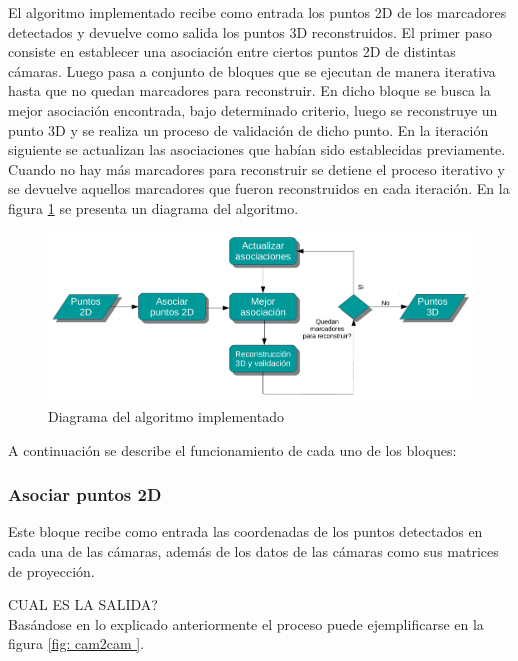 El algoritmo implementado recibe como entrada los puntos 2D de los marcadores detectados y devuelve como salida los puntos 3D reconstruidos. El primer paso consiste en establecer una asociación entre ciertos puntos 2D de distintas cámaras. Luego pasa a conjunto de bloques que se ejecutan de manera iterativa hasta que no quedan marcadores para reconstruir. En dicho bloque se busca la mejor asociación encontrada, bajo determinado criterio, luego se reconstruye un punto 3D y se realiza un proceso de validación de dicho punto. En la iteración siguiente se actualizan las asociaciones que habían sido establecidas previamente. Cuando no hay más marcadores para reconstruir se detiene el proceso iterativo y se devuelve aquellos marcadores que fueron reconstruidos en cada iteración. En la figura \ref{fig: diagrama algoritmo} se presenta un diagrama del algoritmo.\\

\begin{figure}[H]
\begin{center}
\includegraphics[scale=0.6]{img/Reconstruccion/diagrama_algoritmo.pdf}
\end{center}
\caption{Diagrama del algoritmo implementado}
\label{fig: diagrama algoritmo}
\end{figure}

A continuación se describe el funcionamiento de cada uno de los bloques:

\subsubsection*{Asociar puntos 2D}

Este bloque recibe como entrada las coordenadas de los puntos detectados en cada una de las cámaras, además de los datos de las cámaras como sus matrices de proyección.

CUAL ES LA SALIDA?\\


 Basándose en lo explicado anteriormente el proceso puede ejemplificarse en la figura \ref{fig: cam2cam }. \\

